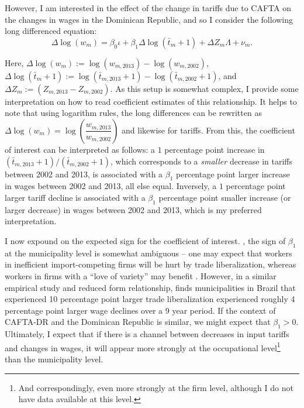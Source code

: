 \documentclass[12pt]{article}
\begin{document}
However, I am interested in the effect of the change in tariffs due to CAFTA on the changes in wages
in the Dominican Republic, and so I consider the following long differenced equation:
\begin{equation}
\label{eq:Equation2}
\Delta\log(w_m) = \beta_0 \iota + \beta_1 \Delta\log(\bar{t}_{m}+1)+ \Delta Z_m \Lambda + \nu_m.
\end{equation}

Here, $\Delta \log(w_m) := \log(w_{m,2013}) - \log(w_{m,2002})$,
$\Delta\log(\bar{t}_{m}+1) := \log(\bar{t}_{m,2013}+1)-\log(\bar{t}_{m,2002}+1)$, 
and $\Delta Z_m :=  (Z_{m, 2013}-Z_{m, 2002})$. As this setup is somewhat complex,
I provide some interpretation on how to read coefficient estimates of this relationship.
It helps to note that using logarithm rules, the long differences can be rewritten as 
$\Delta \log(w_m) = \log \left(\dfrac{w_{m,2013}}{w_{m,2002}} \right)$ and likewise for tariffs.
From this, the coefficient of interest can be interpreted as follows: a $1$ percentage point increase 
in $(\bar{t}_{m,2013}+1)/(\bar{t}_{m,2002}+1)$, which corresponds to a \textit{smaller} decrease in 
tariffs between 2002 and 2013, is associated with a $\beta_1$ percentage point larger increase in wages
between 2002 and 2013, all else equal. Inversely, a $1$ percentage point larger tariff decline is associated
with a $\beta_1$ percentage point smaller increase (or larger decrease) in wages 
between 2002 and 2013, which is my preferred interpretation.

I now expound on the expected sign for the coefficient of interest. , the sign of $\beta_1$ at the 
municipality level is somewhat ambiguous -- one may expect that workers in inefficient import-competing 
firms will be hurt by trade liberalization, whereas workers in firms with a ``love of variety'' may 
benefit \citep{dixit1977monopolistic}. However, in a similar empirical study and reduced form relationship,
\citet{kovak} finds municipalities in Brazil that experienced 10 percentage point larger trade 
liberalization experienced roughly 4 percentage point larger wage declines over a 9 year period.
If the context of CAFTA-DR and the Dominican Republic is similar, we might expect that $\beta_1 > 0$.
Ultimately, I expect that if there is a channel between decreases in input tariffs and changes in
wages, it will appear more strongly at the occupational level\footnote{And correspondingly,
even more strongly at the firm level, although I do not have data available at this level.} 
than the municipality level.
\end{document}
